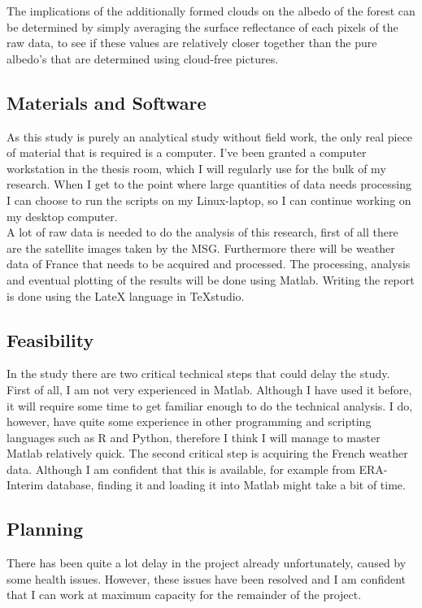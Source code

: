\documentclass{article}
\begin{document}
The implications of the additionally formed clouds on the albedo of the forest can be determined by simply averaging the surface reflectance of each pixels of the raw data, to see if these values are relatively closer together than the pure albedo's that are determined using cloud-free pictures.\\

\subsection{Materials and Software}
As this study is purely an analytical study without field work, the only real piece of material that is required is a computer. I've been granted a computer workstation in the thesis room, which I will regularly use for the bulk of my research. When I get to the point where large quantities of data needs processing I can choose to run the scripts on my Linux-laptop, so I can continue working on my desktop computer.\\

A lot of raw data is needed to do the analysis of this research, first of all there are the satellite images taken by the MSG. Furthermore there will be weather data of France that needs to be acquired and processed. The processing, analysis and eventual plotting of the results will be done using Matlab. Writing the report is done using the LateX language in TeXstudio. \\

\subsection{Feasibility}
In the study there are two critical technical steps that could delay the study. First of all, I am not very experienced in Matlab. Although I have used it before, it will require some time to get familiar enough to do the technical analysis. I do, however, have quite some experience in other programming and scripting languages such as R and Python, therefore I think I will manage to master Matlab relatively quick. The second critical step is acquiring the French weather data. Although I am confident that this is available, for example from ERA-Interim database, finding it and loading it into Matlab might take a bit of time. \\

\subsection{Planning}
There has been quite a lot delay in the project already unfortunately, caused by some health issues. However, these issues have been resolved and I am confident that I can work at maximum capacity for the remainder of the project.\\
\end{document}
